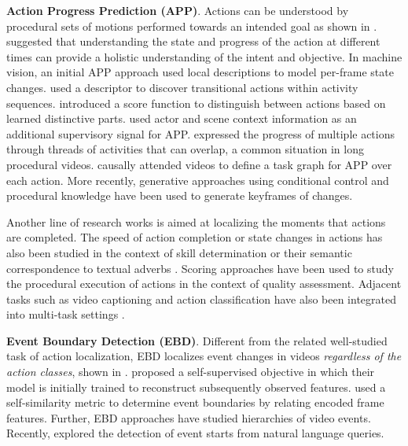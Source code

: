 \noindent
\textbf{Action Progress Prediction (APP)}. Actions can be understood by procedural sets of motions performed towards an intended goal as shown in .  suggested that understanding the state and progress of the action at different times can provide a holistic understanding of the intent and objective. In machine vision, an initial APP approach  used local descriptions to model per-frame state changes.  used a descriptor to discover transitional actions within activity sequences.  introduced a score function to distinguish between actions based on learned distinctive parts.  used actor and scene context information as an additional supervisory signal for APP.  expressed the progress of multiple actions through threads of activities that can overlap, a common situation in long procedural videos.  causally attended videos to define a task graph for APP over each action. More recently, generative approaches  using conditional control  and procedural knowledge  have been used to generate keyframes of changes. 

Another line of research works  is aimed at localizing the moments that actions are completed. The speed of action completion or state changes in actions has also been studied in the context of skill determination  or their semantic correspondence to textual adverbs . Scoring approaches  have been used to study the procedural execution of actions in the context of quality assessment. Adjacent tasks such as video captioning and action classification have also been integrated into multi-task settings .

\noindent
\textbf{Event Boundary Detection (EBD)}. Different from the related well-studied task of action localization, EBD  localizes event changes in videos \emph{regardless of the action classes}, shown in .  proposed a self-supervised objective in which their model is initially trained to reconstruct subsequently observed features.  used a self-similarity metric to determine event boundaries by relating encoded frame features. Further, EBD approaches  have studied hierarchies of video events. Recently,   
explored the detection of event starts from natural language queries. 

